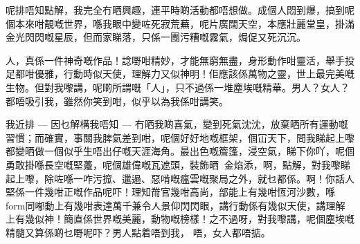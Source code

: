 呢排唔知點解，我完全冇晒興趣，連平時啲活動都唔想做。成個人悶到爆，搞到呢個本來咁靚嘅世界，喺我眼中變咗死寂荒蕪，呢片廣闊天空，本應壯麗堂皇，掛滿金光閃閃嘅星辰，但而家睇落，只係一團污糟嘅霧氣，焗促又死沉沉。

人，真係一件神奇嘅作品！諗嘢咁精妙，才能無窮無盡，身形動作咁靈活，舉手投足都咁優雅，行動時似天使，理解力又似神明！佢應該係萬物之靈，世上最完美嘅生物。但對我嚟講，呢啲所謂嘅「人」，只不過係一堆塵埃嘅精華。男人？女人？都唔吸引我，雖然你笑到咁，似乎以為我係咁講笑。

我近排 — 因乜解構我唔知 — 冇晒我啲喜氣，變到死氣沈沈，放棄晒所有運動嘅習慣；而確實，事關我脾氣差到咁，呢個好好地嘅框架，個冚天下，問我睇起上嚟都變晒做一個似乎生唔出仔嘅天涯海角。最出色嘅簷篷，浸空氣，睇下你吖，呢個勇敢掛喺長空嘅堅躉，呢個雄偉嘅瓦遮頭，裝飾晒金焰添，啊，點解，對我嚟睇起上嚟，除咗喺一咋污搲、邋遢、惡啃嘅瘟雲嘅聚局之外，就乜都係。啊！你話人堅係一件幾咁正嘅作品呢吓！理知黹官幾咁高尚，部能上有幾咁恆河沙數，喺form同喐動上有幾咁表達萬千兼令人景仰閃閃眼，講行動係有幾似天使，講理解上有幾似神！簡直係世界嘅美麗，動物嘅榜樣！之不過呀，對我嚟講，呢個塵埃嘅精髓又算係啲乜嘢呢吓？男人點着唔到我， 唔，女人都唔掂。